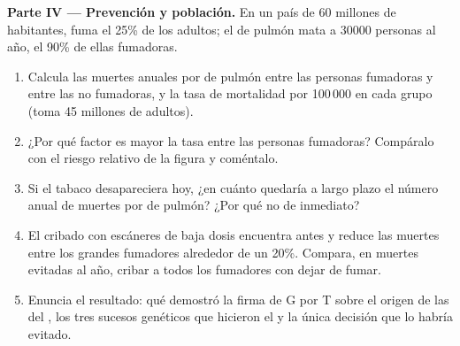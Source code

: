 \begin{problem}
\medskip
\noindent\textbf{Parte IV --- Prevención y población.}
En un país de 60 millones de habitantes, fuma el 25\% de los adultos;
el  de pulmón mata a $\num{30000}$ personas al año, el 90\% de
ellas fumadoras.
\begin{enumerate}[resume]
  \item Calcula las muertes anuales por  de pulmón entre las
        personas fumadoras y entre las no fumadoras, y la tasa de
        mortalidad por 100\,000 en cada grupo (toma 45 millones de
        adultos).
  \item ¿Por qué factor es mayor la tasa entre las personas fumadoras?
        Compáralo con el riesgo relativo de la figura y coméntalo.
  \item Si el tabaco desapareciera hoy, ¿en cuánto quedaría a largo
        plazo el número anual de muertes por  de pulmón? ¿Por qué
        no de inmediato?
  \item El cribado con escáneres de baja dosis encuentra  antes
        y reduce las muertes entre los grandes fumadores alrededor de
        un 20\%. Compara, en muertes evitadas al año, cribar a todos
        los fumadores con dejar de fumar.
  \item Enuncia el resultado: qué demostró la firma de G por T sobre el
        origen de las  del , los tres sucesos genéticos
        que hicieron el  y la única decisión que lo habría
        evitado.
\end{enumerate}
\end{problem}
